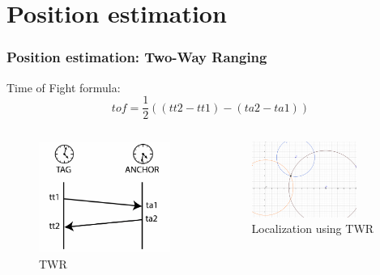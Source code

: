 \documentclass[10pt]{beamer}
\begin{document}
\section{Position estimation}

\begin{frame}
    \frametitle{Position estimation: Two-Way Ranging}
    Time of Fight formula: 
    \begin{equation}
        tof = \frac{1}{2} ((tt2 - tt1) - (ta2 - ta1))
        \label{eqn:pos_est_twr_tof}
    \end{equation}
    \begin{columns}
        \begin{figure}[H]
            \centering
            \includegraphics[width=1\textwidth]{twr_protocol.png}
            \caption{TWR}
            \label{fig:twr_anchor_and_tag}
        \end{figure}
        \begin{figure}[H]
            \centering
            \includegraphics[width=0.8\textwidth]{twr.png}
            \caption{Localization using TWR}
            \label{fig:twr_trilateration}
        \end{figure}
    \end{columns}
\end{frame}
\end{document}
